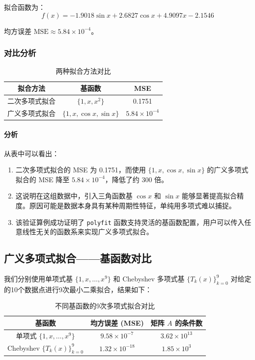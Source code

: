 \documentclass{article}
\begin{document}
拟合函数为：
\[
f(x) = -1.9018 \sin x + 2.6827 \cos x + 4.9097 x - 2.1546
\]

均方误差 $\mathrm{MSE} \approx 5.84 \times 10^{-4}$。

\subsubsection{对比分析}

\begin{table}[h]
\centering
\begin{tabular}{ccc}
\toprule
拟合方法 & 基函数 & MSE \\
\midrule
二次多项式拟合 & $\{1, x, x^2\}$ & 0.1751 \\
广义多项式拟合 & $\{1, x, \cos x, \sin x\}$ & $5.84 \times 10^{-4}$ \\
\bottomrule
\end{tabular}
\caption{两种拟合方法对比}
\end{table}

\paragraph{分析} 从表中可以看出：
\begin{enumerate}
    \item 二次多项式拟合的 MSE 为 0.1751，而使用 $\{1, x, \cos x, \sin x\}$ 的广义多项式拟合的 MSE 降至 $5.84 \times 10^{-4}$，降低了约 300 倍。
    \item 这说明在这组数据中，引入三角函数基 $\cos x$ 和 $\sin x$ 能够显著提高拟合精度。原因可能是数据本身具有某种周期性特征，单纯用多项式难以捕捉。
    \item 该验证算例成功证明了 \texttt{polyfit} 函数支持灵活的基函数配置，用户可以传入任意线性无关的函数系来实现广义多项式拟合。
\end{enumerate}

\subsection{广义多项式拟合——基函数对比}

我们分别使用单项式基 $\{1, x, \dots, x^9\}$ 和 Chebyshev 多项式基 $\{T_k(x)\}_{k=0}^{9}$ 对给定的10个数据点进行9次最小二乘拟合，结果如下：

\begin{table}[h]
\centering
\begin{tabular}{ccc}
\toprule
基函数 & 均方误差 (MSE) & 矩阵 $A$ 的条件数 \\
\midrule
单项式 $\{1, x, \dots, x^9\}$ & $9.58 \times 10^{-7}$ & $3.62 \times 10^{13}$ \\
Chebyshev $\{T_k(x)\}_{k=0}^9$ & $1.32 \times 10^{-18}$ & $1.85 \times 10^{3}$ \\
\bottomrule
\end{tabular}
\caption{不同基函数的9次多项式拟合对比}
\end{table}
\end{document}
